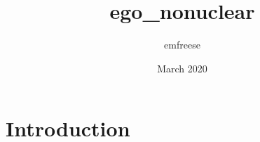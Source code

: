 \documentclass{article}
\title{ego_nonuclear}
\author{emfreese }
\date{March 2020}
\begin{document}
\maketitle

\section{Introduction}
\end{document}
